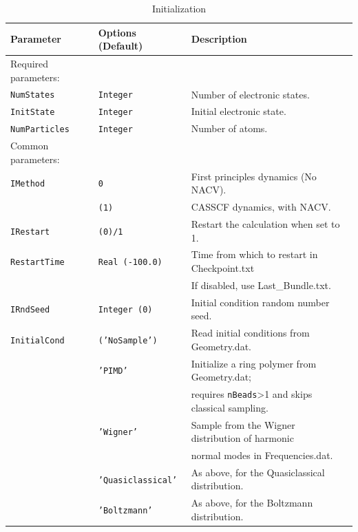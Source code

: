 \documentclass[11pt]{article}
\begin{document}
\begin{table}[h]
\caption{Initialization} \label{tab:aims}
\begin{tabular}{ l l l }
\hline\hline
Parameter & Options (Default) & Description \\
\hline
Required parameters:\\
{\tt NumStates}      &{\tt Integer}             & {\small Number of electronic states.}\\
{\tt InitState}      &{\tt Integer}             & {\small Initial electronic state.}\\
{\tt NumParticles}   &{\tt Integer}             & {\small Number of atoms.}\\
Common parameters:\\
{\tt IMethod}        &{\tt 0}                   & {\small First principles dynamics (No NACV).}\\
                     &{\tt (1)}                 & {\small CASSCF dynamics, with NACV.}\\
{\tt IRestart}       &{\tt (0)/1}               & {\small Restart the calculation when set to 1.}\\
{\tt RestartTime}    &{\tt Real (-100.0)}       & {\small Time from which to restart in Checkpoint.txt}\\&&
                                                  {\small If disabled, use Last\_Bundle.txt.}\\
{\tt IRndSeed}       &{\tt Integer (0)}         & {\small Initial condition random number seed.}\\
{\tt InitialCond}    &{\tt ('NoSample')}        & {\small Read initial conditions from Geometry.dat.}\\
                     &{\tt 'PIMD'}              & {\small Initialize a ring polymer from Geometry.dat;}\\&&
                                                  {\small requires {\tt nBeads}>1 and skips classical sampling.}\\
                     &{\tt 'Wigner'}            & {\small Sample from the Wigner distribution of harmonic}\\&&
                                                  {\small normal modes in Frequencies.dat.}\\
                     &{\tt 'Quasiclassical'}    & {\small As above, for the Quasiclassical distribution.}\\
                     &{\tt 'Boltzmann'}         & {\small As above, for the Boltzmann distribution.}\\

\end{tabular}
\end{table}
\end{document}

